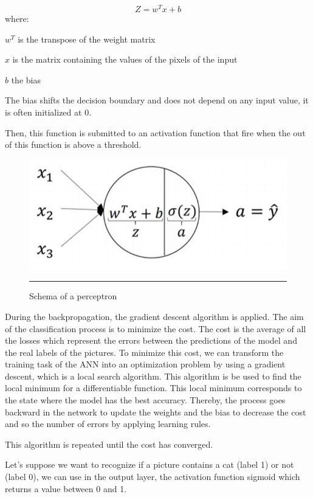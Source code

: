 \begin{equation}
Z=w^T x + b
\end{equation}
where:

$w^T$ is the transpose of the weight matrix 

$x$ is the matrix containing the values of the pixels of the input  

$b$  the bias 

The bias shifts the decision boundary and does not depend on any input value, it is often initialized at 0.

Then, this function is submitted to an activation function that fire when the out of this function is above a threshold.

\begin{figure}[htbp]
  \centering
    \includegraphics[width=\textwidth]{Figures/Perceptron.png}
    \rule{35em}{0.5pt}
  \caption[Schema of a perceptron]{Schema of a perceptron}
  \label{fig:Perceptron}
\end{figure}


During the backpropagation, the gradient descent algorithm is applied. The aim of the classification process is to minimize the cost. The cost is the average of all the losses which represent the errors between the predictions of the model and the real labels of the pictures. To minimize this cost, we can transform the training task of the ANN into an optimization problem by using a gradient descent, which is a local search algorithm. This algorithm is be used to find the local minimum for a differentiable function. This local minimum corresponds to the state where the model has the best accuracy. Thereby, the process goes backward in the network to update the weights and the bias to decrease the cost and so the number of errors by applying learning rules. 

This algorithm is repeated until the cost has converged.

Let's suppose we want to recognize if a picture contains a cat (label 1) or not (label 0), we can use in the output layer, the activation function sigmoid which returns a value between 0 and 1.

